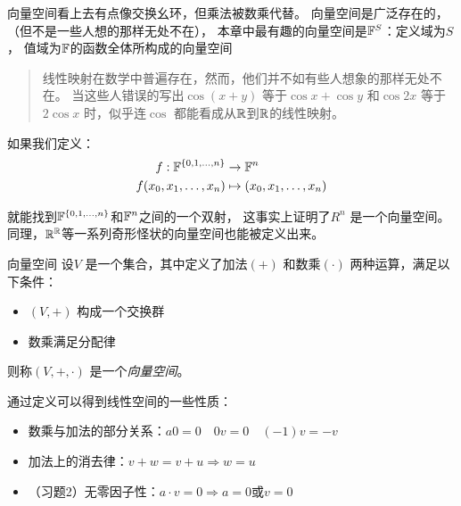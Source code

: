 向量空间看上去有点像交换幺环，但乘法被数乘代替。
向量空间是广泛存在的，（但不是一些人想的那样无处不在），
本章中最有趣的向量空间是\(\mathbb{F}^{S}\)：定义域为\(S\)，
值域为\(\mathbb{F}\)的函数全体所构成的向量空间
\begin{quote}
    线性映射在数学中普遍存在，然而，他们并不如有些人想象的那样无处不在。
    当这些人错误的写出\(\cos(x+y)\) 等于\(\cos x+\cos y\) 和\(\cos 2x\)
    等于 \(2\cos x\) 时，似乎连\(\cos\)
    都能看成从\(\mathbb{R}\)到\(\mathbb{R}\)的线性映射。
\end{quote}
如果我们定义：
\[
    \begin{aligned}
        f: \mathbb{F}^{\{0,1,\dots,n\}} &\to \mathbb{F}^{n}\\
        f(x_{0}, x_{1}, \dots, x_{n}) &\mapsto (x_{0},
        x_{1}, \dots, x_{n})
    \end{aligned}
\]

就能找到\(\mathbb{F}^{\{0,1,\dots,n\}}\)和\(\mathbb{F}^{n}\)之间的一个双射，
这事实上证明了\(R^{n}\)
是一个向量空间。
同理，\(\mathbb{R}^{\mathbb{R}}\)等一系列奇形怪状的向量空间也能被定义出来。
\begin{definition}{向量空间}
    设\(V\) 是一个集合，其中定义了加法\((+)\) 和数乘\((\cdot)\) 两种运算，满足以下条件：
    \begin{itemize}
        \item \((V, +)\) 构成一个交换群
        \item 数乘满足分配律
    \end{itemize}
    则称\((V, +, \cdot)\) 是一个\emph{向量空间}。
\end{definition}

通过定义可以得到线性空间的一些性质：
\begin{itemize}
    \item 数乘与加法的部分关系：\(a0=0\quad 0v=0\quad (-1)v=-v\)
    \item 加法上的消去律：\(v+w=v+u \Rightarrow w=u \)
    \item （习题2）无零因子性：\(a\cdot v=0 \Rightarrow a=0
        \text{或} v=0\)
\end{itemize}

